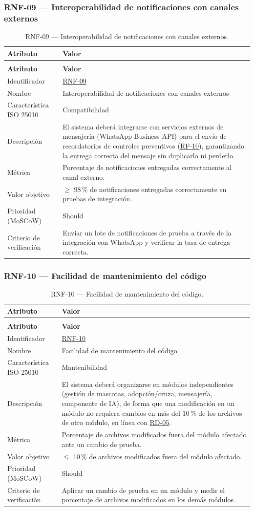 \documentclass[journal,onecolumn]{IEEEtran}
\makeatletter
\newenvironment{atributos}[2]{%
	\small
	\begin{longtable}{@{}>{\raggedright\arraybackslash}p{4.2cm} >{\raggedright\arraybackslash}p{11.2cm}@{}}
		\caption{#2}\label{tab:#1}\\
		\toprule
		\textbf{Atributo} & \textbf{Valor} \\
		\midrule
		\endfirsthead
		\multicolumn{2}{@{}l}{\small\itshape (continuación)}\\
		\toprule
		\textbf{Atributo} & \textbf{Valor} \\
		\midrule
		\endhead
		\bottomrule
		\endlastfoot
	}{%
	\end{longtable}
	\normalsize
}
\makeatother
\begin{document}
	\subsubsection{RNF-09 --- Interoperabilidad de notificaciones con canales externos}
	
	\begin{atributos}{RNF-09}{RNF-09 --- Interoperabilidad de notificaciones con canales externos.}
		Identificador & \hyperref[tab:RNF-09]{RNF-09} \\
		Nombre & Interoperabilidad de notificaciones con canales externos \\
		Característica ISO 25010 & Compatibilidad \\
		Descripción & El sistema deberá integrarse con servicios externos de mensajería (WhatsApp Business API) para el envío de recordatorios de controles preventivos (\hyperref[tab:RF-10]{RF-10}), garantizando la entrega correcta del mensaje sin duplicarlo ni perderlo. \\
		Métrica & Porcentaje de notificaciones entregadas correctamente al canal externo. \\
		Valor objetivo & $\geq$ 98\,\% de notificaciones entregadas correctamente en pruebas de integración. \\
		Prioridad (MoSCoW) & Should \\
		Criterio de verificación & Enviar un lote de notificaciones de prueba a través de la integración con WhatsApp y verificar la tasa de entrega correcta. \\
	\end{atributos}
	
	\subsubsection{RNF-10 --- Facilidad de mantenimiento del código}
	
	\begin{atributos}{RNF-10}{RNF-10 --- Facilidad de mantenimiento del código.}
		Identificador & \hyperref[tab:RNF-10]{RNF-10} \\
		Nombre & Facilidad de mantenimiento del código \\
		Característica ISO 25010 & Mantenibilidad \\
		Descripción & El sistema deberá organizarse en módulos independientes (gestión de mascotas, adopción/cruza, mensajería, componente de IA), de forma que una modificación en un módulo no requiera cambios en más del 10\,\% de los archivos de otro módulo, en línea con \hyperref[tab:RD-05]{RD-05}. \\
		Métrica & Porcentaje de archivos modificados fuera del módulo afectado ante un cambio de prueba. \\
		Valor objetivo & $\leq$ 10\,\% de archivos modificados fuera del módulo afectado. \\
		Prioridad (MoSCoW) & Should \\
		Criterio de verificación & Aplicar un cambio de prueba en un módulo y medir el porcentaje de archivos modificados en los demás módulos. \\
	\end{atributos}
	
\end{document}
